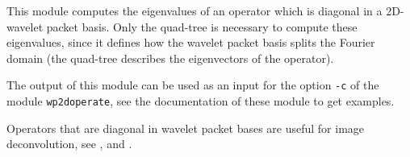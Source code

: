 This module computes the eigenvalues of an operator which is diagonal
in a 2D-wavelet packet basis. Only the quad-tree is necessary to compute these
eigenvalues, since it defines how the wavelet packet basis splits
the Fourier domain (the quad-tree describes the eigenvectors of the operator).

The output of this module can be used as an input for the option 
\verb+-c+ of the module \verb+wp2doperate+, see the documentation of
these module to get examples.

Operators that are diagonal in wavelet packet bases are useful for
image deconvolution, see \cite{kalifa.mallat.ea:image}, 
\cite{mallat:wavelet} and \cite{malgouyres:framework}.

